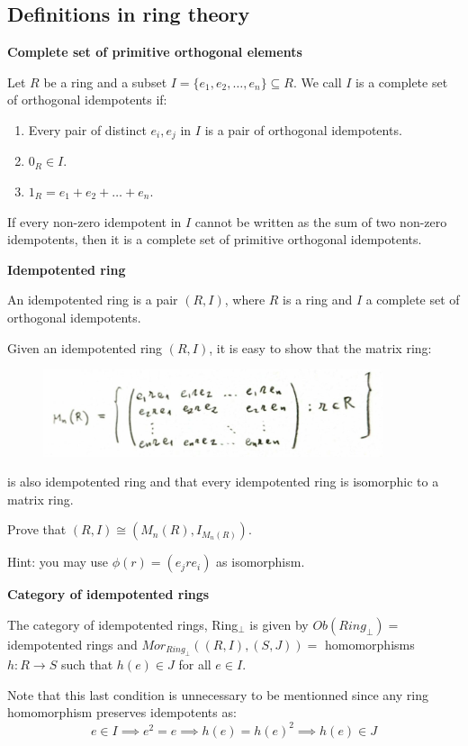 \subsection{Definitions in ring theory}

\begin{definition}
\textbf{Complete set of primitive orthogonal elements}

Let $R$ be a ring and a subset $I = \{e_1, e_2,\ldots, e_n\} \subseteq R$. We call $I$ is a complete set of orthogonal idempotents if:

\begin{enumerate}
\item Every pair of distinct $e_i, e_j$ in $I$ is a pair of orthogonal idempotents.
\item $0_R \in I$.
\item $1_R = e_1 + e_2 + \ldots + e_n$.
\end{enumerate}

If every non-zero idempotent in $I$ cannot be written as the sum of two non-zero idempotents, then it is a complete set of primitive orthogonal idempotents.

\textbf{Idempotented ring}

An idempotented ring is a pair $(R, I)$, where $R$ is a ring and $I$ a complete set of orthogonal idempotents.

\begin{example}
Given an idempotented ring $(R,I)$, it is easy to show that the matrix ring:

\begin{figure}[H]
\centering
\includegraphics[width=10cm]{images/mring.jpg}
\end{figure}

is also idempotented ring and that every idempotented ring is isomorphic to a matrix ring.
\end{example}

\begin{exercise}
Prove that $(R,I) \cong (M_n(R),I_{M_n(R)})$. 

Hint: you may use $\phi(r) = (e_jre_i)$ as isomorphism.
\end{exercise}


\textbf{Category of idempotented rings}

The category of idempotented rings, Ring$_\perp$ is given by $Ob(Ring_\perp) = $ idempotented rings and $Mor_{Ring_\perp}((R, I),(S, J)) = $ homomorphisms $h: R \to S$ such that $h(e) \in J$ for all $e \in I$.

Note that this last condition is unnecessary to be mentionned since any ring homomorphism preserves idempotents as: $$e \in I \implies e^2 = e \implies h(e) = h(e)^2 \implies h(e) \in J$$


\end{definition}

